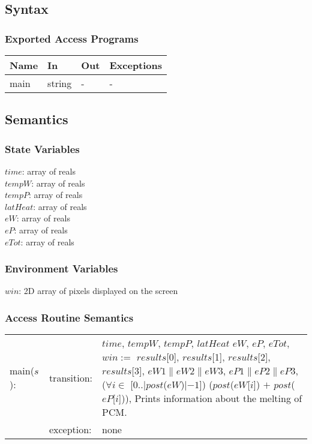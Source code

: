 \documentclass[12pt]{article}
\begin{document}
\subsection{Syntax}
\subsubsection{Exported Access Programs}
\begin{center}
\begin{tabular}{p{2cm} p{4cm} p{4cm} p{2cm}}
\hline
\textbf{Name} & \textbf{In} & \textbf{Out} & \textbf{Exceptions} \\
\hline
main & string & - & - \\
\hline
\end{tabular}
\end{center}
\subsection{Semantics}
\subsubsection{State Variables}
$time$: array of reals \\
$tempW$: array of reals \\
$tempP$: array of reals \\
$latHeat$: array of reals \\
$eW$: array of reals \\
$eP$: array of reals \\ 
$eTot$: array of reals
\subsubsection{Environment Variables}
$win$: 2D array of pixels displayed on the screen
\subsubsection{Access Routine Semantics}
\begin{tabular}{l l p{12cm}}
main($s$): & transition: & $time$, $tempW$, $tempP$, $latHeat$ $eW$, $eP$, $eTot$, $win :=$ $results$[0], $results$[1], $results$[2], $results$[3], $eW1 \| eW2 \| eW3$, $eP1 \| eP2 \| eP3$, ($\forall i \in$ [0..$|post$($eW$)$| - 1$]) ($post$($eW$[$i$]) $+$ $post$($eP$[$i$])), Prints information about the melting of PCM. \\
& exception: & none \\
\end{tabular}
\end{document}
